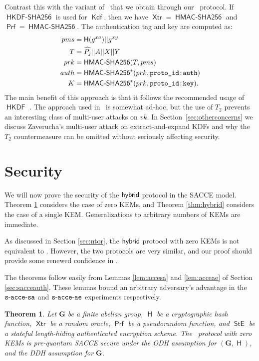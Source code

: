\documentclass[USenglish,oneside,twocolumn]{article}
\theoremstyle{dgthm}
\newtheorem{theorem}{Theorem}[section]
\theoremstyle{dgdef}
\newcommand{\ntor}{{\sf {ntor}}}
\newcommand{\hybrid}{{\sf {hybrid}}}
\newcommand{\con}{||}
\newcommand{\AlgorithmName}[1]{\operatorname{\mathsf{#1}}}
\newcommand{\Hash}{\AlgorithmName{H}}
\newcommand{\KDF}{\AlgorithmName{Kdf}}
\newcommand{\PRF}{\AlgorithmName{Prf}}
\newcommand{\XTR}{\AlgorithmName{Xtr}}
\newcommand{\HMACS}{\AlgorithmName{HMAC-SHA256}}
\newcommand{\HKDF}{\AlgorithmName{HKDF}}
\newcommand{\HKDFS}{\AlgorithmName{HKDF-SHA256}}
\newcommand{\STE}{\AlgorithmName{StE}}
\newcommand{\Token}[1]{\textnormal{\tt{#1}}}
\newcommand{\Experiment}[1]{\operatorname{\tt{#1}}}
\begin{document}
  Contrast this with the variant of \ntor~that we obtain through our \hybrid~protocol.
  If $\HKDFS$ is used for $\KDF$, then we have $\XTR = \HMACS$ and
  $\PRF = \HMACS$.  The authentication tag and key are computed as:
  \begin{align*}
    pms &= \Hash(g^{xa}) \con g^{xy}\\
    T &= \widehat{P_j} \con A \con X \con Y\\
    prk &= \HMACS(T, pms)\\
    auth &= \HMACS^*(prk, \Token{proto\_id:auth})\\
    K &= \HMACS^*(prk, \Token{proto\_id:key}).
  \end{align*}
  The main benefit of this approach is that it follows the recommended usage of
  $\HKDF$ \cite{Krawczyk2010}. The approach used in \ntor~is somewhat ad-hoc,
  but the use of $T_2$ prevents an interesting class of multi-user attacks on
  $vk$. In Section~\ref{sec:otherconcerns} we discuss Zaverucha's multi-user
  attack on extract-and-expand KDFs \cite{Zaverucha2012} and why the $T_2$
  countermeasure can be omitted without seriously affecting security.

\section{Security}
  \label{sec:security}

  We will now prove the security of the $\hybrid$ protocol in the SACCE model.
  Theorem \ref{thm:ntor} considers the case of zero KEMs, and Theorem \ref{thm:hybrid}
  considers the case of a single KEM. Generalizations to arbitrary numbers of KEMs are
  immediate.

  As discussed in Section \ref{sec:ntor}, the $\hybrid$ protocol with zero KEMs is not
  equivalent to \ntor. However, the two protocols are very similar, and our proof
  should provide some renewed confidence in \ntor.

  The theorems follow easily from Lemmas \ref{lem:accesa} and \ref{lem:acceae}
  of Section \ref{sec:sacceauth}.  These lemmas bound an arbitrary adversary's
  advantage in the $\Experiment{s-acce-sa}$ and $\Experiment{s-acce-ae}$
  experiments respectively.

  \begin{theorem}\label{thm:ntor}
    Let $\mathbf{G}$ be a finite abelian group, $\Hash$ be a cryptographic hash
    function, $\XTR$ be a random oracle, $\PRF$ be a pseudorandom function, and
    $\STE$ be a stateful length-hiding authenticated encryption scheme.
    The \hybrid~protocol with zero KEMs is pre-quantum SACCE secure under the
    ODH assumption for $(\mathbf{G}, \Hash)$, and the DDH assumption for
    $\mathbf{G}$.
  \end{theorem}
\end{document}
